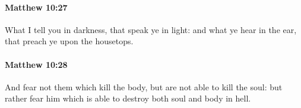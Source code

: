 		\paragraph{Matthew 10:27} %
			\label{MATTHEW-10-27}

			What I tell you in darkness, that speak ye in light: and what ye hear in the ear, that preach ye upon the housetops.

			\begin{framed}
			\scriptsize
				\begin{compactdesc}
					\item[SBLG] 
				\end{compactdesc}
			\end{framed}

		\paragraph{Matthew 10:28} %
			\label{MATTHEW-10-28}

			And fear not them which kill the body, but are not able to kill the soul: but rather fear him which is able to destroy both soul and body in hell.

